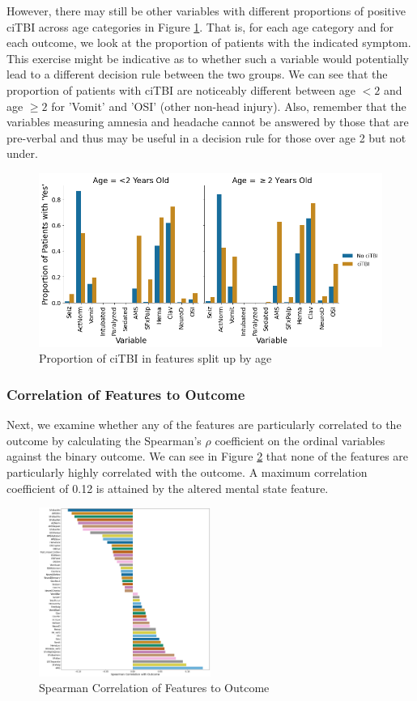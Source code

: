 \documentclass[11pt]{amsart}
\begin{document}
However, there may still be other variables with different proportions of positive ciTBI across age categories in Figure \ref{fig:age_covariate}. That is, for each age category and for each outcome, we look at the proportion of patients with the indicated symptom. This exercise might be indicative as to whether such a variable would potentially lead to a different decision rule between the two groups. We can see that the proportion of patients with ciTBI are noticeably different between age $<2$ and age $\geq 2$ for 'Vomit' and 'OSI' (other non-head injury). Also, remember that the variables measuring amnesia and headache cannot be answered by those that are pre-verbal and thus may be useful in a decision rule for those over age 2 but not under.
\FloatBarrier
\begin{figure}
	\centering
	\includegraphics[width=\textwidth]{covariate_by_age.png}
	\caption{Proportion of ciTBI in features split up by age}\label{fig:age_covariate}
\end{figure}
\FloatBarrier

\subsubsection{Correlation of Features to Outcome}

Next, we examine whether any of the features are particularly correlated to the outcome by calculating the Spearman's $\rho$ coefficient on the ordinal variables against the binary outcome. We can see in Figure \ref{fig:spearman_corr_to_outcome} that none of the features are particularly highly correlated with the outcome. A maximum correlation coefficient of 0.12 is attained by the altered mental state feature.
\FloatBarrier
\begin{figure}
	\centering
	\includegraphics[width=0.5\textwidth]{spearman_corr_to_outcome.png}
	\caption{Spearman Correlation of Features to Outcome}\label{fig:spearman_corr_to_outcome}
\end{figure}
\FloatBarrier
\end{document}

